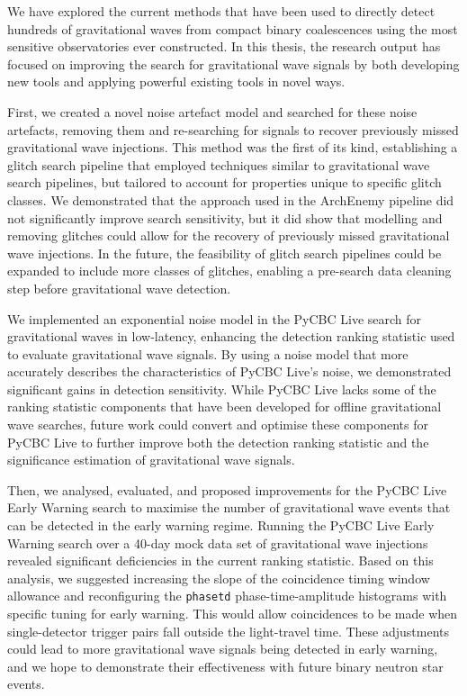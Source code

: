 We have explored the current methods that have been used to directly detect hundreds of gravitational waves from compact binary coalescences using the most sensitive observatories ever constructed. In this thesis, the research output has focused on improving the search for gravitational wave signals by both developing new tools and applying powerful existing tools in novel ways.

First, we created a novel \scladj noise artefact model and searched for these noise artefacts, removing them and re-searching for signals to recover previously missed gravitational wave injections. This method was the first of its kind, establishing a glitch search pipeline that employed techniques similar to gravitational wave search pipelines, but tailored to account for properties unique to specific glitch classes. We demonstrated that the approach used in the ArchEnemy pipeline did not significantly improve search sensitivity, but it did show that modelling and removing glitches could allow for the recovery of previously missed gravitational wave injections. In the future, the feasibility of glitch search pipelines could be expanded to include more classes of glitches, enabling a pre-search data cleaning step before gravitational wave detection.

We implemented an exponential noise model in the PyCBC Live search for gravitational waves in low-latency, enhancing the detection ranking statistic used to evaluate gravitational wave signals. By using a noise model that more accurately describes the characteristics of PyCBC Live’s noise, we demonstrated significant gains in detection sensitivity. While PyCBC Live lacks some of the ranking statistic components that have been developed for offline gravitational wave searches, future work could convert and optimise these components for PyCBC Live to further improve both the detection ranking statistic and the significance estimation of gravitational wave signals.

Then, we analysed, evaluated, and proposed improvements for the PyCBC Live Early Warning search to maximise the number of gravitational wave events that can be detected in the early warning regime. Running the PyCBC Live Early Warning search over a 40-day mock data set of gravitational wave injections revealed significant deficiencies in the current ranking statistic. Based on this analysis, we suggested increasing the slope of the coincidence timing window allowance and reconfiguring the \texttt{phasetd} phase-time-amplitude histograms with specific tuning for early warning. This would allow coincidences to be made when single-detector trigger pairs fall outside the light-travel time. These adjustments could lead to more gravitational wave signals being detected in early warning, and we hope to demonstrate their effectiveness with future binary neutron star events.

